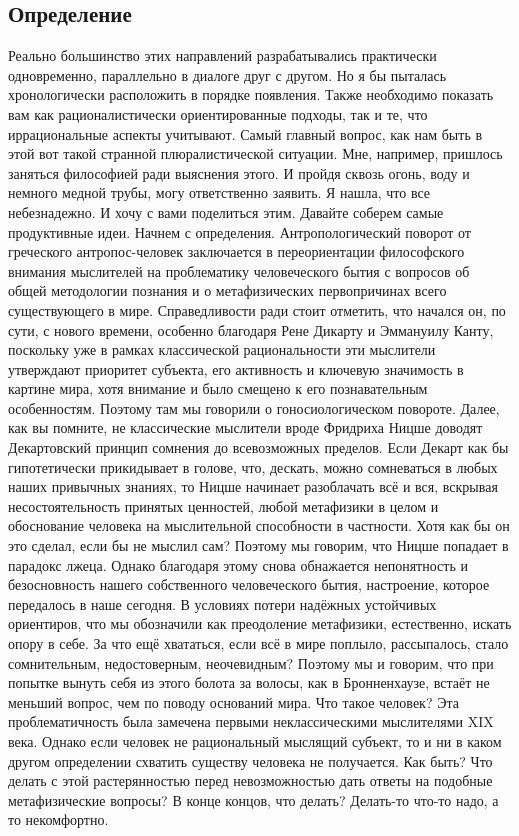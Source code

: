 \subsection{Определение}

Реально большинство этих направлений разрабатывались практически
одновременно, параллельно в диалоге друг с другом. Но я бы пыталась
хронологически расположить в порядке появления. Также необходимо показать вам
как рационалистически ориентированные подходы, так и те, что иррациональные
аспекты учитывают. 
Самый главный вопрос, как нам быть в этой вот такой странной плюралистической
ситуации. Мне, например, пришлось заняться философией ради выяснения этого. И
пройдя сквозь огонь, воду и немного медной трубы, могу ответственно заявить. Я
нашла, что все небезнадежно. И хочу с вами поделиться этим. Давайте соберем
самые продуктивные идеи. Начнем с определения. Антропологический поворот от
греческого антропос-человек заключается в переориентации философского внимания
мыслителей на проблематику человеческого бытия с вопросов об общей методологии
познания и о метафизических первопричинах всего существующего в мире.
Справедливости ради стоит отметить, что начался он, по сути, с нового времени,
особенно благодаря Рене Дикарту и Эммануилу Канту, поскольку уже в рамках
классической рациональности эти мыслители утверждают приоритет субъекта, его
активность и ключевую значимость в картине мира, хотя внимание и было смещено к
его познавательным особенностям. Поэтому там мы говорили о гоносиологическом
повороте. Далее, как вы помните, не классические мыслители вроде Фридриха Ницше
доводят Декартовский принцип сомнения до всевозможных пределов. Если Декарт как
бы гипотетически прикидывает в голове, что, дескать, можно сомневаться в любых
наших привычных знаниях, то Ницше начинает разоблачать всё и вся, вскрывая
несостоятельность принятых ценностей, любой метафизики в целом и обоснование
человека на мыслительной способности в частности. Хотя как бы он это сделал,
если бы не мыслил сам? Поэтому мы говорим, что Ницше попадает в парадокс лжеца.
Однако благодаря этому снова обнажается непонятность и безосновность нашего
собственного человеческого бытия, настроение, которое передалось в наше сегодня.
В условиях потери надёжных устойчивых ориентиров, что мы обозначили как
преодоление метафизики, естественно, искать опору в себе. За что ещё хвататься,
если всё в мире поплыло, рассыпалось, стало сомнительным, недостоверным,
неочевидным? Поэтому мы и говорим, что при попытке вынуть себя из этого болота
за волосы, как в Бронненхаузе, встаёт не меньший вопрос, чем по поводу оснований
мира. Что такое человек? Эта проблематичность была замечена первыми
неклассическими мыслителями XIX века. Однако если человек не рациональный
мыслящий субъект, то и ни в каком другом определении схватить существу человека
не получается. Как быть? Что делать с этой растерянностью перед невозможностью
дать ответы на подобные метафизические вопросы? В конце концов, что делать?
Делать-то что-то надо, а то некомфортно. 

